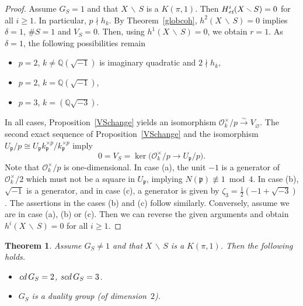 \documentclass[10pt]{article}
\newcommand{\Q}{{\mathbb Q}}
\renewcommand{\O}{{\mathcal{O}}}
\newcommand{\p}{{\mathfrak p}}
\newcommand{\sm}{{\,\smallsetminus\,}}
\newcommand{\et}{\text{\it et}}
\newcommand{\cd}{\text{\it cd}\:}
\newcommand{\scd}{\text{\it scd}\:}
\theoremstyle{alex}
\newtheorem{theorem}{Theorem}[section]
\theoremstyle{alexdef}
\begin{document}
\begin{proof}  Assume $G_S=1$ and that $X \sm S$ is a $K(\pi,1)$. Then $H^i_\et(X\sm S)=0$ for all $i\geq 1$. In particular, $p\nmid h_k$. By Theorem~\ref{globcoh}, $h^2(X\sm S)=0$ implies $\delta=1$, $\# S=1$ and $V_S=0$. Then, using $h^1(X\sm S)=0$, we obtain $r=1$. As $\delta=1$, the following possibilities remain

\begin{itemize}
\item[\rm (a)] $p=2$, $k\neq\Q(\sqrt{-1})$ is imaginary quadratic and $2\nmid h_k$,
\item[\rm (b)] $p=2$, $k=\Q(\sqrt{-1})$,
\item[\rm (c)] $p=3$, $k=(\Q\sqrt{-3})$.
\end{itemize}
In all cases, Proposition~\ref{VSchange} yields an isomorphism
$\O_k^\times/p \stackrel{\sim}{\to} V_\varnothing$.  The second exact sequence of Proposition~\ref{VSchange} and the isomorphism $U_\p/p \cong U_\p k_\p^{\times p}/k_\p^{\times p}$ imply
\[
0=V_S=\ker \big( \O_k^\times/p \to U_\p/p  \big).
\]
Note that $\O_k^\times/p$\/ is one-dimensional.
In case (a), the unit $-1$ is a generator of $\O_k^\times/2$ which must not be a square in  $U_\p$, implying $N(\p)\not\equiv 1 \bmod 4$.   In case (b), $\sqrt{-1}$ is a generator, and in case (c), a generator is given by $\zeta_3=\frac{1}{2}(-1+\sqrt{-3})$. The assertions  in the cases (b) and (c) follow similarly. Conversely, assume we are in case (a), (b) or (c). Then we can reverse the given arguments and obtain $h^i(X\sm S)=0$ for all $i\geq 1$.
\end{proof}

\begin{theorem}
Assume  $G_S\neq 1$ and that $X\sm S$ is a $K(\pi,1)$. Then the following holds.

\begin{itemize}
\item[\rm (i)] $\cd G_S=2$, $\scd G_S=3$.
\item[\rm (ii)] $G_S$ is a duality group (of dimension~$2$).
\end{itemize}
\end{theorem}
\end{document}

